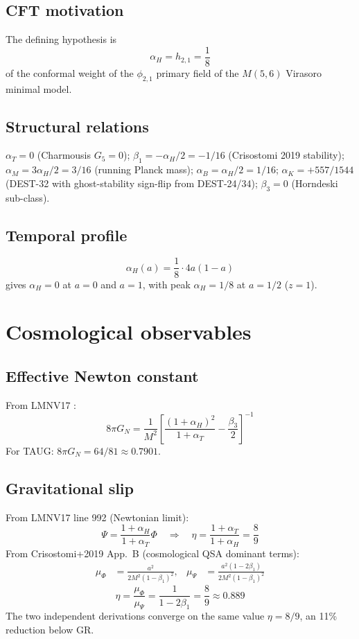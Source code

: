 \documentclass[aps,prd,twocolumn,floatfix,nofootinbib]{revtex4-2}
\begin{document}
\subsection{CFT motivation}
The defining hypothesis is
\begin{equation}
\alpha_H = h_{2,1} = \frac{1}{8}
\end{equation}
of the conformal weight of the $\phi_{2,1}$ primary field of the
$M(5,6)$ Virasoro minimal model.

\subsection{Structural relations}
$\alpha_T = 0$ (Charmousis $G_5 = 0$); $\beta_1 = -\alpha_H/2 = -1/16$
(Crisostomi 2019 stability); $\alpha_M = 3\alpha_H/2 = 3/16$ (running
Planck mass); $\alpha_B = \alpha_H/2 = 1/16$; $\alpha_K = +557/1544$
(DEST-32 with ghost-stability sign-flip from DEST-24/34); $\beta_3 = 0$
(Horndeski sub-class).

\subsection{Temporal profile}
\begin{equation}
\alpha_H(a) = \frac{1}{8} \cdot 4 a (1-a)
\end{equation}
gives $\alpha_H = 0$ at $a = 0$ and $a = 1$, with peak $\alpha_H = 1/8$
at $a = 1/2$ ($z = 1$).

\section{Cosmological observables}

\subsection{Effective Newton constant}
From LMNV17 \cite{Langlois2017}:
\begin{equation}
8\pi G_N = \frac{1}{M^2}\left[\frac{(1+\alpha_H)^2}{1+\alpha_T} - \frac{\beta_3}{2}\right]^{-1}
\end{equation}
For TAUG: $\boxed{8\pi G_N = 64/81 \approx 0.7901}$.

\subsection{Gravitational slip}
From LMNV17 line 992 (Newtonian limit):
\begin{equation}
\Psi = \frac{1+\alpha_H}{1+\alpha_T}\Phi \quad\Longrightarrow\quad
\eta = \frac{1+\alpha_T}{1+\alpha_H} = \frac{8}{9}
\end{equation}
From Crisostomi+2019 \cite{Crisostomi2019} App.~B (cosmological QSA
dominant terms):
\begin{align}
\mu_\Phi &= \frac{a^2}{2 M^2 (1-\beta_1)^2}, &
\mu_\Psi &= \frac{a^2 (1-2\beta_1)}{2 M^2 (1-\beta_1)^2}
\end{align}
\begin{equation}
\boxed{\,\eta = \frac{\mu_\Phi}{\mu_\Psi} = \frac{1}{1-2\beta_1} = \frac{8}{9} \approx 0.889\,}
\end{equation}
The two independent derivations converge on the same value $\eta = 8/9$,
an 11\% reduction below GR.
\end{document}
